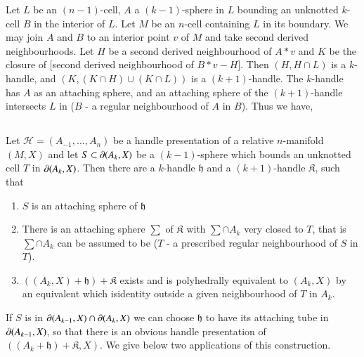Let $L$ be an $(n-1)$-cell, $A$ a $(k-1)$-sphere in $L$ bounding an unknotted $k$-cell $B$ in the interior of $L$. Let $M$ be an $n$-cell containing $L$ in its boundary. We may join $A$ and $B$ to an interior point $v$ of $M$ and take second derived neighbourhoods. Let $H$ be a second derived neighbourhood of $A\ast v$ and $K$ be the closure of [second derived neighbourhood of $B\ast v-H$]. Then $
(H,H\cap L)$ is a $k$-handle, and $(K,(K\cap H)\cup (K\cap L))$ is a $(k+1)$-handle. The $k$-handle has $A$ as an attaching sphere, and an attaching sphere of the $(k+1)$-handle intersects $L$ in ($B$ - a regular neighbourhood of $A$ in $B$). Thus we have,

\subsection{}\label{chap8-sec8.6.1}
Let $\mathscr{H}=(A_{-1},\ldots,A_{n})$ be a handle presentation of a relative $n$-manifold $(M,X)$ and let $S\subset \partial (A_{k},X)$ be a $(k-1)$-sphere which bounds an unknotted cell $T$ in $\partial(A_{k},X)$. Then there are a $k$-handle $\mathfrak{h}$ and a $(k+1)$-handle $\mathfrak{K}$, such that
\begin{enumerate}
\renewcommand{\labelenumi}{(\theenumi)}
\item $S$ is an attaching sphere of $\mathfrak{h}$

\item There is an attaching sphere $\sum$ of $\mathfrak{K}$ with $\sum \cap A_{k}$ very closed to $T$, that is $\sum \cap A_{k}$ can be assumed to be ($T$ - a prescribed regular neighbourhood of $S$ in $T$).

\item $((A_{k},X)+\mathfrak{h})+\mathfrak{K}$ exists and is polyhedrally equivalent to $(A_{k},X)$ by an equivalent which is\pageoriginale identity outside a given neighbourhood of $T$ in $A_{k}$.
\end{enumerate}

If $S$ is in $\partial(A_{k-1},X)\cap \partial (A_{k},X)$ we can choose $\mathfrak{h}$ to have its attaching tube in $\partial(A_{k-1},X)$, so that there is an obvious handle presentation of $((A_{k}+\mathfrak{h})+\mathfrak{K},X)$. We give below two applications of this construction.


